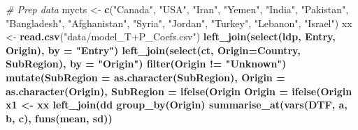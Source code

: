 \documentclass[
]{article}
\newenvironment{Shaded}{\begin{snugshade}}{\end{snugshade}}
\newcommand{\CommentTok}[1]{\textcolor[rgb]{0.56,0.35,0.01}{\textit{#1}}}
\newcommand{\DataTypeTok}[1]{\textcolor[rgb]{0.13,0.29,0.53}{#1}}
\newcommand{\KeywordTok}[1]{\textcolor[rgb]{0.13,0.29,0.53}{\textbf{#1}}}
\newcommand{\NormalTok}[1]{#1}
\newcommand{\OperatorTok}[1]{\textcolor[rgb]{0.81,0.36,0.00}{\textbf{#1}}}
\newcommand{\StringTok}[1]{\textcolor[rgb]{0.31,0.60,0.02}{#1}}
\begin{document}
\begin{Shaded}
\begin{Highlighting}[]
\CommentTok{# Prep data}
\NormalTok{mycts <-}\StringTok{ }\KeywordTok{c}\NormalTok{(}\StringTok{"Canada"}\NormalTok{, }\StringTok{"USA"}\NormalTok{, }\StringTok{"Iran"}\NormalTok{, }\StringTok{"Yemen"}\NormalTok{,}
           \StringTok{"India"}\NormalTok{, }\StringTok{"Pakistan"}\NormalTok{, }\StringTok{"Bangladesh"}\NormalTok{, }\StringTok{"Afghanistan"}\NormalTok{,}
           \StringTok{"Syria"}\NormalTok{, }\StringTok{"Jordan"}\NormalTok{, }\StringTok{"Turkey"}\NormalTok{, }\StringTok{"Lebanon"}\NormalTok{, }\StringTok{"Israel"}\NormalTok{)}
\NormalTok{xx <-}\StringTok{ }\KeywordTok{read.csv}\NormalTok{(}\StringTok{"data/model_T+P_Coefs.csv"}\NormalTok{) }\OperatorTok{%
\StringTok{  }\KeywordTok{left_join}\NormalTok{(}\KeywordTok{select}\NormalTok{(ldp, Entry, Origin), }\DataTypeTok{by =} \StringTok{"Entry"}\NormalTok{) }\OperatorTok{%
\StringTok{  }\KeywordTok{left_join}\NormalTok{(}\KeywordTok{select}\NormalTok{(ct, }\DataTypeTok{Origin=}\NormalTok{Country, SubRegion), }\DataTypeTok{by =} \StringTok{"Origin"}\NormalTok{) }\OperatorTok{%
\StringTok{  }\KeywordTok{filter}\NormalTok{(Origin }\OperatorTok{!=}\StringTok{ "Unknown"}\NormalTok{) }\OperatorTok{%
\StringTok{  }\KeywordTok{mutate}\NormalTok{(}\DataTypeTok{SubRegion =} \KeywordTok{as.character}\NormalTok{(SubRegion), }\DataTypeTok{Origin =} \KeywordTok{as.character}\NormalTok{(Origin),}
         \DataTypeTok{SubRegion =} \KeywordTok{ifelse}\NormalTok{(Origin }\OperatorTok{%
         \DataTypeTok{Origin =} \KeywordTok{ifelse}\NormalTok{(Origin }\OperatorTok{%
\NormalTok{x1 <-}\StringTok{ }\NormalTok{xx }\OperatorTok{%
\StringTok{  }\KeywordTok{left_join}\NormalTok{(dd }\OperatorTok{%
\StringTok{  }\KeywordTok{group_by}\NormalTok{(Origin) }\OperatorTok{%
\StringTok{  }\KeywordTok{summarise_at}\NormalTok{(}\KeywordTok{vars}\NormalTok{(DTF, a, b, c), }\KeywordTok{funs}\NormalTok{(mean, sd)) }\OperatorTok{%
}}}}}}}}}}
\end{Highlighting}
\end{Shaded}
\end{document}
